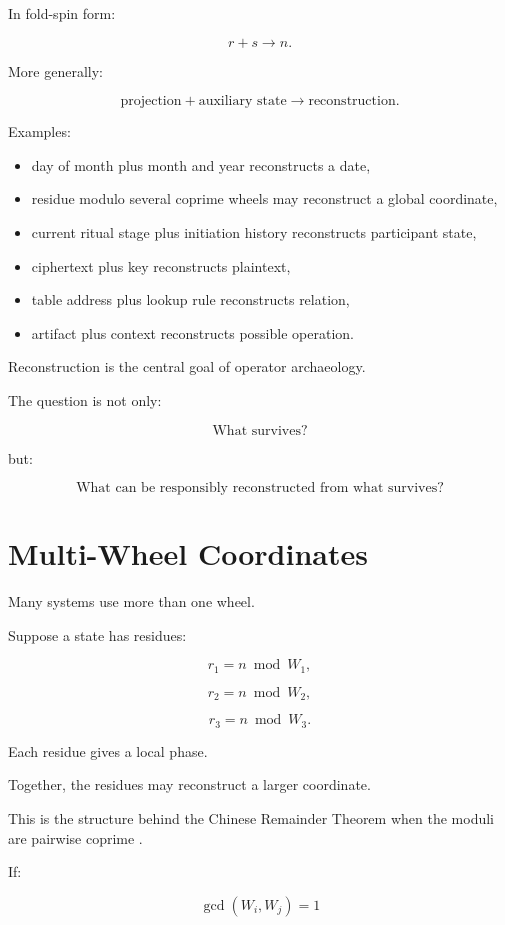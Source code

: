 \documentclass[11pt]{book}
\begin{document}
In fold-spin form:

\[
r + s \rightarrow n.
\]

More generally:

\[
\text{projection}
+
\text{auxiliary state}
\rightarrow
\text{reconstruction}.
\]

Examples:

\begin{itemize}
    \item day of month plus month and year reconstructs a date,
    \item residue modulo several coprime wheels may reconstruct a global coordinate,
    \item current ritual stage plus initiation history reconstructs participant state,
    \item ciphertext plus key reconstructs plaintext,
    \item table address plus lookup rule reconstructs relation,
    \item artifact plus context reconstructs possible operation.
\end{itemize}

Reconstruction is the central goal of operator archaeology.

The question is not only:

\[
\text{What survives?}
\]

but:

\[
\text{What can be responsibly reconstructed from what survives?}
\]

\section{Multi-Wheel Coordinates}

Many systems use more than one wheel.

Suppose a state has residues:

\[
r_1 = n \bmod W_1,
\]

\[
r_2 = n \bmod W_2,
\]

\[
r_3 = n \bmod W_3.
\]

Each residue gives a local phase.

Together, the residues may reconstruct a larger coordinate.

This is the structure behind the Chinese Remainder Theorem when the moduli are pairwise coprime \cite{HardyWright2008NumberTheory,Needham1959ScienceCivilisationChina3}.

If:

\[
\gcd(W_i,W_j)=1
\]
\end{document}

